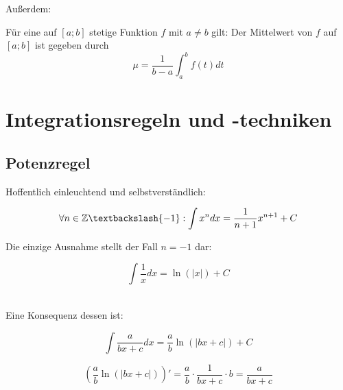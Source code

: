 \documentclass[main.tex]{subfiles}
\begin{document}
Außerdem:
\begin{Definition}
  Für eine auf $[a;b]$ stetige Funktion $f$ mit $a \neq b$ gilt: Der Mittelwert von $f$ auf $[a;b]$ ist gegeben durch $$\mu = \dfrac{1}{b-a} \int_a^b f(t)dt$$
\end{Definition}

\section{Integrationsregeln und -techniken}

\subsection{Potenzregel}
Hoffentlich einleuchtend und selbstverständlich:
\begin{Theorem}
  $$\forall n \in \Z \textbackslash \{ -1\}:\int  x^n dx = \frac{1}{n+1}x^{n+1} + C$$
\end{Theorem}
\begin{Bemerkung}
  Die einzige Ausnahme stellt der Fall $n=-1$ dar:
  \begin{Theorem}
    $$\int \dfrac{1}{x} dx = \ln(|x|) + C$$
  \end{Theorem}
\end{Bemerkung}\\
Eine Konsequenz dessen ist:
\begin{Theorem}
  $$\int \dfrac{a}{bx+c} dx = \dfrac{a}{b}\ln(|bx+c|) + C$$
\end{Theorem}
\begin{Beweis}
  $$\left(\dfrac{a}{b}\ln(|bx+c|)\right)' = \dfrac{a}{b}\cdot \dfrac{1}{bx+c}\cdot b = \dfrac{a}{bx+c}$$
\end{Beweis}
\end{document}
